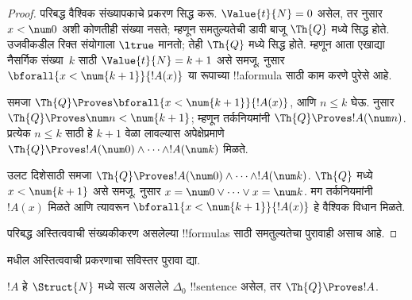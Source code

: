 \documentclass[../../../include/open-logic-section]{subfiles}
\begin{document}
\begin{proof}
    परिबद्ध वैश्विक संख्यापकाचे प्रकरण सिद्ध करू.
    $\Value{t}{N} = 0$ असेल, तर
     नुसार
    $x<\num 0$ अशी कोणतीही संख्या नसते; म्हणून
    समतुल्यतेची डावी बाजू $\Th{Q}$ मध्ये सिद्ध होते.
    उजवीकडील रिक्त संयोगाला $\ltrue$ मानतो;
    तेही $\Th{Q}$ मध्ये सिद्ध होते.
    म्हणून आता एखाद्या नैसर्गिक संख्या~$k$ साठी
    $\Value{t}{N} = k+1$ असे समजू.
     नुसार
    $\bforall{x<\num{k+1}}{!A(x)}$ या रूपाच्या
    !!a{formula} साठी काम करणे पुरेसे आहे.

    समजा
    $\Th{Q} \Proves \bforall{x<\num{k+1}}{!A(x)}$,
    आणि $n \leq k$ घेऊ.
     नुसार
    $\Th{Q} \Proves \num n < \num{k+1}$;
    म्हणून तर्कनियमांनी
    $\Th{Q} \Proves !A(\num n)$.
    प्रत्येक $n \leq k$ साठी हे $k+1$ वेळा
    लावल्यास अपेक्षेप्रमाणे
    $\Th{Q} \Proves !A(\num 0)
    \land \dots \land !A(\num k)$ मिळते.

    उलट दिशेसाठी समजा
    $\Th{Q} \Proves
    !A(\num 0) \land \dots \land !A(\num k)$.
    $\Th{Q}$ मध्ये $x < \num{k+1}$ असे समजू.
     नुसार
    $x = \num 0 \lor \dots \lor x = \num k$.
    मग तर्कनियमांनी $!A(x)$ मिळते आणि त्यावरून
    $\bforall{x<\num{k+1}}{!A(x)}$ हे वैश्विक विधान
    मिळते.

    परिबद्ध अस्तित्ववाची संख्यकीकरण असलेल्या
    !!{formula}s साठी समतुल्यतेचा पुरावाही असाच आहे.
\end{proof}

\begin{prob}
 मधील अस्तित्ववाची
प्रकरणाचा सविस्तर पुरावा द्या.
\end{prob}

\begin{lem}
$!A$ हे $\Struct{N}$ मध्ये सत्य असलेले
$\Delta_0$ !!{sentence} असेल, तर
$\Th{Q} \Proves !A$.
\end{lem}
\end{document}
